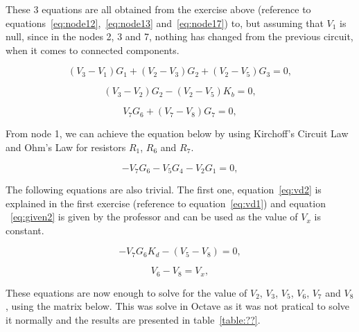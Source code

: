 These 3 equations are all obtained from the exercise above (reference to equations~\ref{eq:node12},~\ref{eq:node13} and~\ref{eq:node17}) to, but assuming that $V_1$ is null, since in the nodes 2, 3 and 7, nothing has changed from the previous circuit, when it comes to connected components.

\begin{equation}
  (V_{3} - V_{1})G_{1} + (V_{2} - V_{3})G_{2} + (V_{2} - V_{5})G_{3}= 0,
  \label{eq:node22}
\end{equation}

\begin{equation}
  (V_{3} - V_{2})G_{2} - (V_{2} - V_{5})K_{b} = 0,
  \label{eq:node23}
\end{equation}

\begin{equation}
  V_{7}G_{6} + (V_{7} - V_{8})G_{7} = 0,
  \label{eq:node27}
\end{equation}

From node 1, we can achieve the equation below by using Kirchoff's Circuit Law and Ohm's Law for resistors $R_1$, $R_6$ and $R_7$.

\begin{equation}
  -V_{7}G_{6} - V_{5}G_{4} - V_{2}G_{1} = 0,
  \label{eq:node21}
\end{equation}


The following equations are also trivial. The first one, equation~\ref{eq:vd2} is explained in the first exercise (reference to equation~\ref{eq:vd1}) and equation ~\ref{eq:given2} is given by the professor and can be used as the value of $V_x$ is constant.

\begin{equation}
  -V_{7}G_{6}K_{d} - (V_{5} - V_{8}) = 0,
  \label{eq:vd2}
\end{equation}


\begin{equation}
  V_{6} - V_{8} = V_{x},
  \label{eq:given2}
\end{equation}

These equations are now enough to solve for the value of $V_2$, $V_3$, $V_5$, $V_6$, $V_7$ and $V_8$, using the matrix below. This was solve in Octave as it was not pratical to solve it normally and the results are presented in table~\ref{table:??}.

